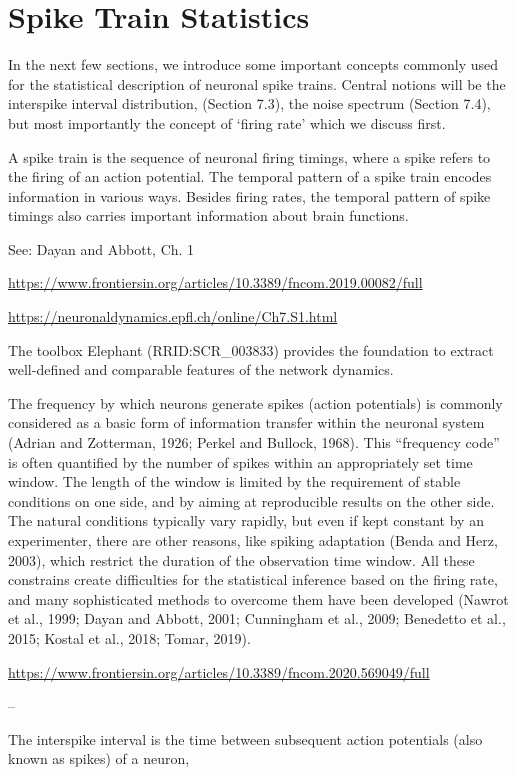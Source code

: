\section{Spike Train Statistics}
In the next few sections, we introduce some important concepts commonly used for the statistical description of neuronal spike trains. Central notions will be the interspike interval distribution, (Section 7.3), the noise spectrum (Section 7.4), but most importantly the concept of ‘firing rate’ which we discuss first.

A spike train is the sequence of neuronal firing timings, where a spike refers to the firing of an action potential. The temporal pattern of a spike train encodes information in various ways. Besides firing rates, the temporal pattern of spike timings also carries important information about brain functions. 

See: Dayan and Abbott, Ch. 1

\url{https://www.frontiersin.org/articles/10.3389/fncom.2019.00082/full}

\url{https://neuronaldynamics.epfl.ch/online/Ch7.S1.html}

The toolbox Elephant (RRID:SCR\_003833) provides the foundation to extract well-defined and comparable features of the network dynamics. 

The frequency by which neurons generate spikes (action potentials) is commonly considered as a basic form of information transfer within the neuronal system (Adrian and Zotterman, 1926; Perkel and Bullock, 1968). This “frequency code” is often quantified by the number of spikes within an appropriately set time window. The length of the window is limited by the requirement of stable conditions on one side, and by aiming at reproducible results on the other side. The natural conditions typically vary rapidly, but even if kept constant by an experimenter, there are other reasons, like spiking adaptation (Benda and Herz, 2003), which restrict the duration of the observation time window. All these constrains create difficulties for the statistical inference based on the firing rate, and many sophisticated methods to overcome them have been developed (Nawrot et al., 1999; Dayan and Abbott, 2001; Cunningham et al., 2009; Benedetto et al., 2015; Kostal et al., 2018; Tomar, 2019).

\url{https://www.frontiersin.org/articles/10.3389/fncom.2020.569049/full}

--


The interspike interval is the time between subsequent action potentials (also known as spikes) of a neuron,

